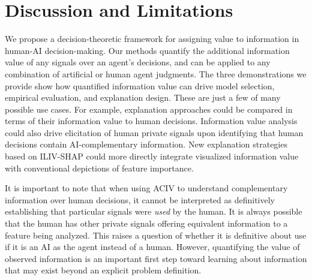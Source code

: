  \mvspace{-2mm}
\section{Discussion and Limitations}
 \mvspace{-2mm}

We propose a decision-theoretic framework for assigning value to information in human-AI decision-making.
Our methods quantify the additional information value of any signals over an agent's decisions, and can be applied to any combination of artificial or human agent judgments. %
The three demonstrations we provide show how quantified information value can drive model selection, empirical evaluation, and explanation design.
These are just a few of many possible use cases. 
For example, explanation approaches could be compared in terms of their information value to human decisions. 
Information value analysis could also drive elicitation of human private signals upon identifying that human decisions contain AI-complementary information.
New explanation strategies based on ILIV-SHAP could more directly integrate visualized information value with conventional depictions of feature importance.  

It is important to note that when using ACIV to understand complementary information over human decisions, it cannot be interpreted as definitively establishing that particular signals were \textit{used} by the human. 
It is always possible that the human has other private signals offering equivalent information to a feature being analyzed.
This raises a question of whether it is definitive about use if it is an AI as the agent instead of a human.
However, quantifying the value of observed information is an important first step toward learning about information that may exist beyond an explicit problem definition.


